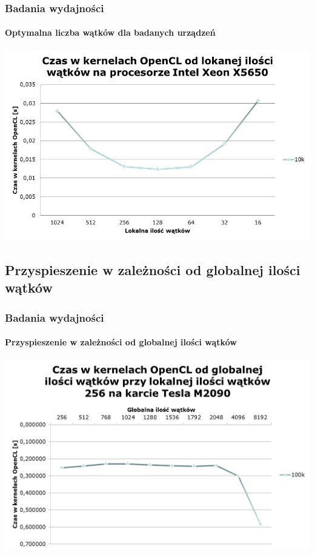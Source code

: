 \documentclass[12pt,handout]{beamer}
\begin{document}
\begin{frame}
\frametitle{Badania wydajności}
\framesubtitle{Optymalna liczba wątków dla badanych urządzeń}
\hfill\includegraphics[scale=0.35]{czas2.png}\hspace*{\fill}
\end{frame}

\subsection{Przyspieszenie w zależności od globalnej ilości wątków}

\begin{frame}
\frametitle{Badania wydajności}
\framesubtitle{Przyspieszenie w zależności od globalnej ilości wątków}
\hfill\includegraphics[scale=0.45]{czas3.png}\hspace*{\fill}
\end{frame}
\end{document}
